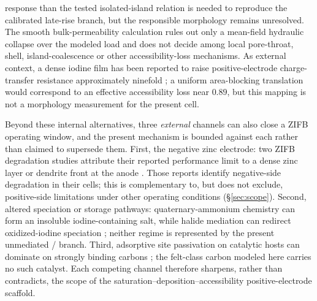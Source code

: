 \documentclass[11pt]{article}
\begin{document}
response than the tested isolated-island relation is needed to reproduce the calibrated late-rise branch, but
the responsible morphology remains unresolved. The smooth bulk-permeability calculation rules out only a
mean-field hydraulic collapse over the modeled load and does not decide among local pore-throat, shell,
island-coalescence or other accessibility-loss mechanisms. As external context, a dense iodine film has been
reported to raise positive-electrode charge-transfer resistance approximately ninefold \citep{Jang2021}; a
uniform area-blocking translation would correspond to an effective accessibility loss near $0.89$, but this
mapping is not a morphology measurement for the present cell.

Beyond these internal alternatives, three \emph{external} channels can also close a ZIFB operating window, and
the present mechanism is bounded against each rather than claimed to supersede them. First, the negative
zinc electrode: two ZIFB degradation studies attribute their reported performance limit to a dense zinc layer or dendrite
front at the anode \citep{Richtr2026,ChaNatCommun2025}. Those reports identify negative-side degradation in
their cells; this is complementary to, but does not exclude, positive-side limitations under other operating
conditions (\S\ref{sec:scope}). Second, altered speciation or
storage pathways: quaternary-ammonium chemistry can form an insoluble iodine-containing salt, while halide
mediation can redirect oxidized-iodine speciation \citep{JiangQA2024,Liao2025}; neither regime is represented
by the present unmediated / branch. Third, adsorptive site passivation on catalytic
hosts can dominate on strongly binding carbons \citep{Xiao_JACS2025}; the felt-class carbon modeled here
carries no such catalyst. Each competing channel therefore sharpens, rather than contradicts, the scope of the
saturation--deposition--accessibility positive-electrode scaffold.
\end{document}
